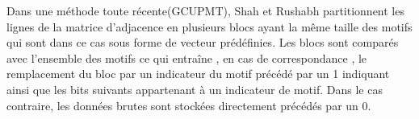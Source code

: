 
			Dans une méthode toute récente(GCUPMT), Shah et Rushabh \citep{shah2018graph}  partitionnent les lignes de la matrice d'adjacence en plusieurs blocs ayant la même taille des motifs qui sont dans ce cas sous forme de vecteur prédéfinies. Les blocs sont comparés avec l'ensemble des motifs ce qui entraîne , en cas de correspondance , le remplacement du bloc par un indicateur du motif précédé par un 1 indiquant ainsi que les bits suivants appartenant à un indicateur de motif. Dans le cas contraire, les données brutes sont stockées directement précédés par un 0.
				